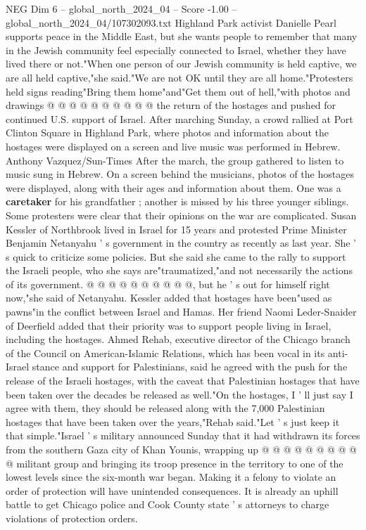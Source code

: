 \begin{textsample}{NEG Dim 6 – global\_north\_2024\_04 – Score -1.00 – global\_north\_2024\_04/107302093.txt}
Highland Park activist Danielle Pearl supports peace in the Middle East, but she wants people to remember that many in the Jewish community feel especially connected to Israel, whether they have lived there or not."When one person of our Jewish community is held captive, we are all held captive,"she said."We are not OK until they are all home."Protesters held signs reading"Bring them home"and"Get them out of hell,"with photos and drawings @ @ @ @ @ @ @ @ @ @ the return of the hostages and pushed for continued U.S. support of Israel.
After marching Sunday, a crowd rallied at Port Clinton Square in Highland Park, where photos and information about the hostages were displayed on a screen and live music was performed in Hebrew.
Anthony Vazquez/Sun-Times After the march, the group gathered to listen to music sung in Hebrew.
On a screen behind the musicians, photos of the hostages were displayed, along with their ages and information about them.
One was a \textbf{caretaker} for his grandfather ; another is missed by his three younger siblings.
Some protesters were clear that their opinions on the war are complicated.
Susan Kessler of Northbrook lived in Israel for 15 years and protested Prime Minister Benjamin Netanyahu ' s government in the country as recently as last year.
She ' s quick to criticize some policies.
But she said she came to the rally to support the Israeli people, who she says are"traumatized,"and not necessarily the actions of its government. @ @ @ @ @ @ @ @ @ @, but he ' s out for himself right now,"she said of Netanyahu.
Kessler added that hostages have been"used as pawns"in the conflict between Israel and Hamas.
Her friend Naomi Leder-Snaider of Deerfield added that their priority was to support people living in Israel, including the hostages.
Ahmed Rehab, executive director of the Chicago branch of the Council on American-Islamic Relations, which has been vocal in its anti-Israel stance and support for Palestinians, said he agreed with the push for the release of the Israeli hostages, with the caveat that Palestinian hostages that have been taken over the decades be released as well."On the hostages, I ' ll just say I agree with them, they should be released along with the 7,000 Palestinian hostages that have been taken over the years,"Rehab said."Let ' s just keep it that simple."Israel ' s military announced Sunday that it had withdrawn its forces from the southern Gaza city of Khan Younis, wrapping up @ @ @ @ @ @ @ @ @ @ militant group and bringing its troop presence in the territory to one of the lowest levels since the six-month war began.
Making it a felony to violate an order of protection will have unintended consequences.
It is already an uphill battle to get Chicago police and Cook County state ' s attorneys to charge violations of protection orders.

\end{textsample}
